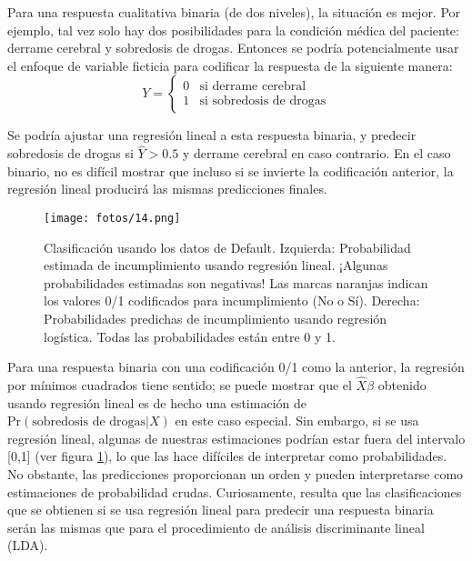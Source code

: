 Para una respuesta cualitativa binaria (de dos niveles), la situación es mejor. Por ejemplo, tal vez solo hay dos posibilidades para la condición médica del paciente: derrame cerebral y sobredosis de drogas. Entonces se podría potencialmente usar el enfoque de variable ficticia para codificar la respuesta de la siguiente manera:
\begin{equation*}
Y = 
\begin{cases} 
0 & \text{si derrame cerebral} \\
1 & \text{si sobredosis de drogas}
\end{cases}
\end{equation*}

Se podría ajustar una regresión lineal a esta respuesta binaria, y predecir sobredosis de drogas si $\hat{Y} > 0.5$ y derrame cerebral en caso contrario. En el caso binario, no es difícil mostrar que incluso si se invierte la codificación anterior, la regresión lineal producirá las mismas predicciones finales. \\

\begin{figure}[h]
\centering
\texttt{[image: fotos/14.png]}
\caption{Clasificación usando los datos de Default. Izquierda: Probabilidad estimada de incumplimiento usando regresión lineal. ¡Algunas probabilidades estimadas son negativas! Las marcas naranjas indican los valores 0/1 codificados para incumplimiento (No o Sí). Derecha: Probabilidades predichas de incumplimiento usando regresión logística. Todas las probabilidades están entre 0 y 1.}
\label{fig:4.2}
\end{figure}

Para una respuesta binaria con una codificación 0/1 como la anterior, la regresión por mínimos cuadrados tiene sentido; se puede mostrar que el $\hat{X}\beta$ obtenido usando regresión lineal es de hecho una estimación de $\text{Pr}(\text{sobredosis de drogas} | X)$ en este caso especial. Sin embargo, si se usa regresión lineal, algunas de nuestras estimaciones podrían estar fuera del intervalo [0,1] (ver figura \ref{fig:4.2}), lo que las hace difíciles de interpretar como probabilidades. No obstante, las predicciones proporcionan un orden y pueden interpretarse como estimaciones de probabilidad crudas. Curiosamente, resulta que las clasificaciones que se obtienen si se usa regresión lineal para predecir una respuesta binaria serán las mismas que para el procedimiento de análisis discriminante lineal (LDA). \\

